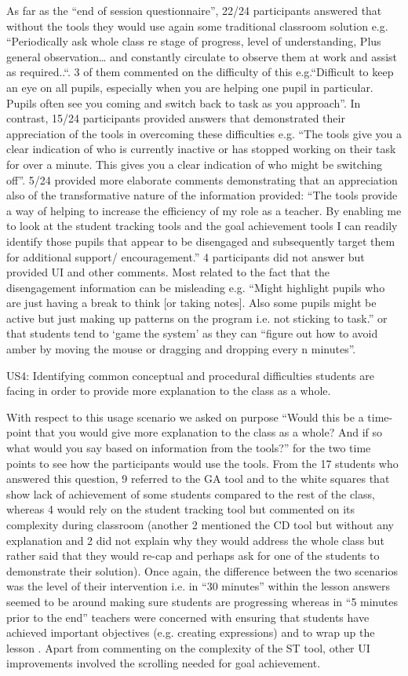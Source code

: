 As far as the “end of session questionnaire”, 22/24 participants
answered that without the tools they would use again some traditional
classroom solution e.g. “Periodically ask whole class re stage of
progress, level of understanding, Plus general observation… and
constantly circulate to observe them at work and assist as
required..“. 3 of them commented on the difficulty of this
e.g.“Difficult to keep an eye on all pupils, especially when you are
helping one pupil in particular. Pupils often see you coming and
switch back to task as you approach”. In contrast, 15/24 participants
provided answers that demonstrated their appreciation of the tools in
overcoming these difficulties e.g. “The tools give you a clear
indication of who is currently inactive or has stopped working on
their task for over a minute. This gives you a clear indication of who
might be switching off”. 5/24 provided more elaborate comments
demonstrating that an appreciation also of the transformative nature
of the information provided: “The tools provide a way of helping to
increase the efficiency of my role as a teacher. By enabling me to
look at the student tracking tools and the goal achievement tools I
can readily identify those pupils that appear to be disengaged and
subsequently target them for additional support/ encouragement.” 4
participants did not answer but provided UI and other comments. Most
related to the fact that the disengagement information can be
misleading e.g. “Might highlight pupils who are just having a break to
think [or taking notes]. Also some pupils might be active but just
making up patterns on the program i.e. not sticking to task.” or that
students tend to ‘game the system’ as they can “figure out how to
avoid amber by moving the mouse or dragging and dropping every n
minutes”.   

US4: Identifying common conceptual and procedural difficulties
students are facing in order to provide more explanation to the class
as a whole.  

With respect to this usage scenario we asked on purpose “Would this be
a time-point that you would give more explanation to the class as a
whole? And if so what would you say based on information from the
tools?” for the two time points to see how the participants would use
the tools. From the 17 students who answered this question, 9 referred
to the GA tool and to the white squares that show lack of achievement
of some students compared to the rest of the class, whereas 4 would
rely on the student tracking tool but commented on its complexity
during classroom (another 2 mentioned the CD tool but without any
explanation and 2 did not explain why they would address the whole
class but rather said that they would re-cap and perhaps ask for one
of the students to demonstrate their solution).  Once again, the
difference between the two scenarios was the level of their
intervention i.e. in “30 minutes” within the lesson answers seemed to
be around making sure students are progressing whereas in “5 minutes
prior to the end” teachers were concerned with ensuring that students
have achieved important objectives (e.g. creating expressions) and to
wrap up the lesson . Apart from commenting on the complexity of the ST
tool, other UI improvements involved the scrolling needed for goal
achievement.

